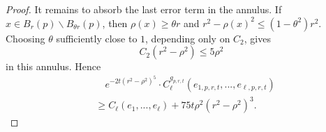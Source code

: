 \documentclass[11pt]{amsart}
\DeclareMathOperator{\Ric}{Ric}
\newtheorem{lemma}[theorem]{Lemma}
\theoremstyle{definition}
\theoremstyle{remark}
\numberwithin{equation}{section}
\begin{document}
\begin{proof}
        It remains to absorb the last error term in the annulus. If
          $x\in B_r(p)\backslash B_{\theta r}(p)$, then $\rho(x)\geq\theta r$ and
          $r^2-\rho(x)^2\leq (1-\theta^2)r^2$. Choosing $\theta$ sufficiently close to $1$, depending
          only on $C_2$, gives
        \[
            C_2(r^2-\rho^2)\leq 5\rho^2
        \]
        in this annulus. Hence
        \[
        \begin{aligned}
            &\quad e^{-2t(r^2-\rho^2)^{5}}\cdot
              C_{\ell}^{g_{p,r,t}}(e_{1,p,r,t},...,e_{\ell,p,r,t})\\
            &\geq C_{\ell}(e_{1},...,e_{\ell})+75t\rho^2(r^2-\rho^2)^{3}.
        \end{aligned}
        \]
    \end{proof}
\end{document}
